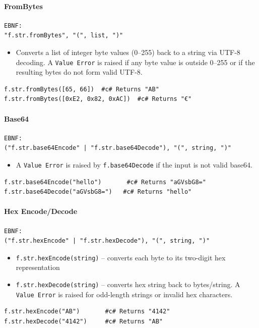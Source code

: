 \paragraph{FromBytes}
\begin{verbatim}
EBNF:
"f.str.fromBytes", "(", list, ")"
\end{verbatim}
\begin{itemize}
\item Converts a list of integer byte values (0--255) back to a string via UTF-8 decoding. A \texttt{Value Error} is raised if any byte value is outside 0--255 or if the resulting bytes do not form valid UTF-8.
\end{itemize}
\begin{verbatim}
f.str.fromBytes([65, 66])  #c# Returns "AB"
f.str.fromBytes([0xE2, 0x82, 0xAC])  #c# Returns "€"
\end{verbatim}

\paragraph{Base64}
\begin{verbatim}
EBNF:
("f.str.base64Encode" | "f.str.base64Decode"), "(", string, ")"
\end{verbatim}
\begin{itemize}
\item A \texttt{Value Error} is raised by \texttt{f.base64Decode} if the input is not valid base64.
\end{itemize}
\begin{verbatim}
f.str.base64Encode("hello")       #c# Returns "aGVsbG8="
f.str.base64Decode("aGVsbG8=")   #c# Returns "hello"
\end{verbatim}

\paragraph{Hex Encode/Decode}
\begin{verbatim}
EBNF:
("f.str.hexEncode" | "f.str.hexDecode"), "(", string, ")"
\end{verbatim}
\begin{itemize}
\item \texttt{f.str.hexEncode(string)} -- converts each byte to its two-digit hex representation
\item \texttt{f.str.hexDecode(string)} -- converts hex string back to bytes/string. A \texttt{Value Error} is raised for odd-length strings or invalid hex characters.
\end{itemize}
\begin{verbatim}
f.str.hexEncode("AB")       #c# Returns "4142"
f.str.hexDecode("4142")     #c# Returns "AB"
\end{verbatim}

